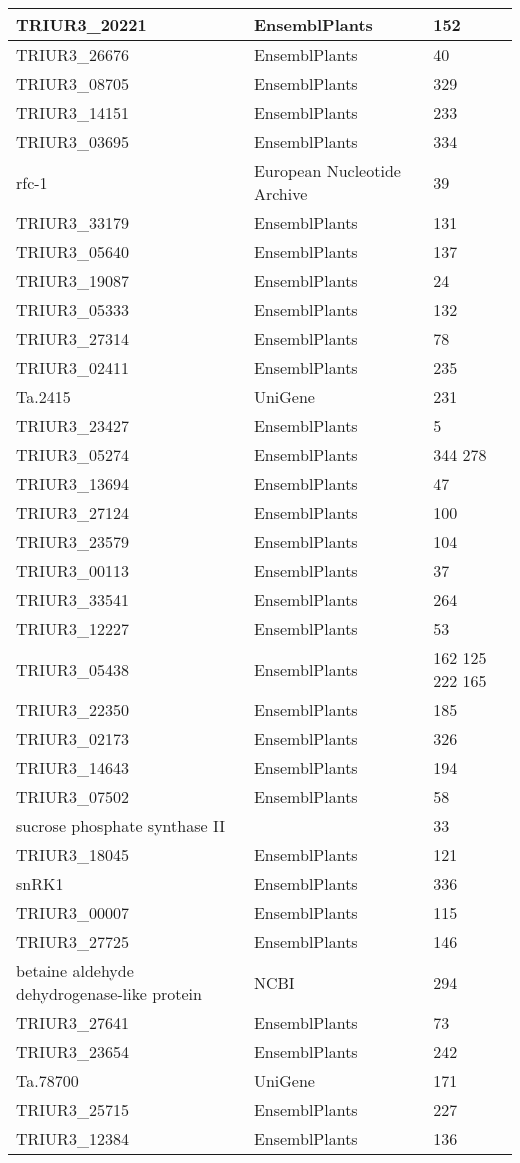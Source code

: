{\begin{longtable}{|p{5cm}|p{5cm}|p{5cm}|}
\hline
TRIUR3\_20221 & EnsemblPlants  & 152 \\
\hline
TRIUR3\_26676 & EnsemblPlants  & 40 \\
\hline
TRIUR3\_08705 & EnsemblPlants  & 329 \\
\hline
TRIUR3\_14151 & EnsemblPlants  & 233 \\
\hline
TRIUR3\_03695 & EnsemblPlants  & 334 \\
\hline
rfc-1 & European Nucleotide Archive & 39 \\
\hline
TRIUR3\_33179 & EnsemblPlants  & 131 \\
\hline
TRIUR3\_05640 & EnsemblPlants  & 137 \\
\hline
TRIUR3\_19087 & EnsemblPlants  & 24 \\
\hline
TRIUR3\_05333 & EnsemblPlants  & 132 \\
\hline
TRIUR3\_27314 & EnsemblPlants  & 78 \\
\hline
TRIUR3\_02411 & EnsemblPlants  & 235 \\
\hline
Ta.2415 & UniGene & 231 \\
\hline
TRIUR3\_23427 & EnsemblPlants  & 5 \\
\hline
TRIUR3\_05274 & EnsemblPlants  & 344 278 \\
\hline
TRIUR3\_13694 & EnsemblPlants  & 47 \\
\hline
TRIUR3\_27124 & EnsemblPlants  & 100 \\
\hline
TRIUR3\_23579 & EnsemblPlants  & 104 \\
\hline
TRIUR3\_00113 & EnsemblPlants  & 37 \\
\hline
TRIUR3\_33541 & EnsemblPlants  & 264 \\
\hline
TRIUR3\_12227 & EnsemblPlants  & 53 \\
\hline
TRIUR3\_05438 & EnsemblPlants  & 162 125 222 165 \\
\hline
TRIUR3\_22350 & EnsemblPlants  & 185 \\
\hline
TRIUR3\_02173 & EnsemblPlants  & 326 \\
\hline
TRIUR3\_14643 & EnsemblPlants  & 194 \\
\hline
TRIUR3\_07502 & EnsemblPlants  & 58 \\
\hline
sucrose phosphate synthase II &  & 33 \\
\hline
TRIUR3\_18045 & EnsemblPlants  & 121 \\
\hline
snRK1 & EnsemblPlants & 336 \\
\hline
TRIUR3\_00007 & EnsemblPlants  & 115 \\
\hline
TRIUR3\_27725 & EnsemblPlants  & 146 \\
\hline
betaine aldehyde dehydrogenase-like protein & NCBI & 294 \\
\hline
TRIUR3\_27641 & EnsemblPlants  & 73 \\
\hline
TRIUR3\_23654 & EnsemblPlants  & 242 \\
\hline
Ta.78700 & UniGene & 171 \\
\hline
TRIUR3\_25715 & EnsemblPlants  & 227 \\
\hline
TRIUR3\_12384 & EnsemblPlants  & 136 \\
\hline
\end{longtable}
}
